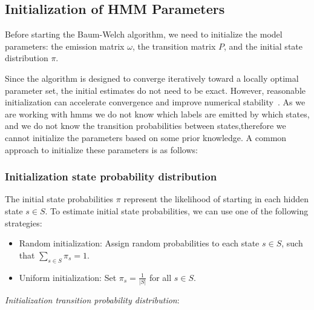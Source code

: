 \subsection{Initialization of HMM Parameters}\label{subsec:initialization}
Before starting the Baum-Welch algorithm, we need to initialize the model parameters: the emission matrix $\omega$, the transition matrix $P$, and the initial state distribution $\pi$.

Since the algorithm is designed to converge iteratively toward a locally optimal parameter set, the initial estimates do not need to be exact.
However, reasonable initialization can accelerate convergence and improve numerical stability~\cite{benyacoub2015initial}.
As we are working with \glspl{hmm} we do not know which labels are emitted by which states, and we do not know the transition probabilities between states,therefore we cannot initialize the parameters based on some prior knowledge.
A common approach to initialize these parameters is as follows:

\subsubsection{Initialization state probability distribution}
The initial state probabilities $\pi$ represent the likelihood of starting in each hidden state $s \in S$.
To estimate initial state probabilities, we can use one of the following strategies:

\begin{itemize}
    \item Random initialization: Assign random probabilities to each state $s \in S$, such that $\sum_{s \in S} \pi_s = 1$.
    \item Uniform initialization: Set $\pi_s = \frac{1}{|S|}$ for all $s \in S$.
\end{itemize}

\textit{Initialization transition probability distribution}:

